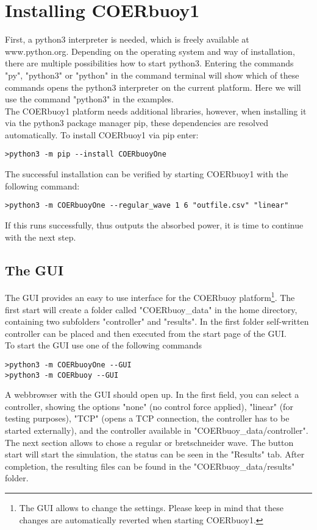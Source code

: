 \documentclass[oneside,10pt,a4paper]{book}
\begin{document}
\section{Installing COERbuoy1}
First, a python3 interpreter is needed, which is freely available at www.python.org. Depending on the operating system and way of installation, there are multiple possibilities how to start python3. Entering the commands "py", "python3" or "python" in the command terminal will show which of these commands opens the python3 interpreter on the current platform. Here we will use the command "python3" in the examples.\\
The COERbuoy1 platform needs additional libraries, however, when installing it via the python3 package manager pip, these dependencies are resolved automatically. To install COERbuoy1 via pip enter:
\begin{verbatim}
>python3 -m pip --install COERbuoyOne
\end{verbatim}
The successful installation can be verified by starting COERbuoy1 with the following command:
\begin{verbatim}
>python3 -m COERbuoyOne --regular_wave 1 6 "outfile.csv" "linear"
\end{verbatim}
If this runs successfully, thus outputs the absorbed power, it is time to continue with the next step.
\subsection{The GUI}
The GUI provides an easy to use interface for the COERbuoy platform\footnote{The GUI allows to change the settings. Please keep in mind that these changes are automatically reverted when starting COERbuoy1.}. The first start will create a folder called "COERbuoy\_data" in the home directory, containing two subfolders "controller" and "results". In  the first folder self-written controller can be placed and then executed from the start page of the GUI.\\
To start the GUI use one of the following commands
\begin{verbatim}
>python3 -m COERbuoyOne --GUI
>python3 -m COERbuoy --GUI
\end{verbatim}
A webbrowser with the GUI should open up. In the first field, you can select a controller, showing the options "none" (no control force applied), "linear" (for testing purposes), "TCP" (opens a TCP connection, the controller has to be started externally), and the controller available in "COERbuoy\_data/controller".\\
The next section allows to chose a regular or bretschneider wave. The button start will start the simulation, the status can be seen in the "Results" tab. After completion, the resulting files can be found in the "COERbuoy\_data/results" folder.
\end{document}
